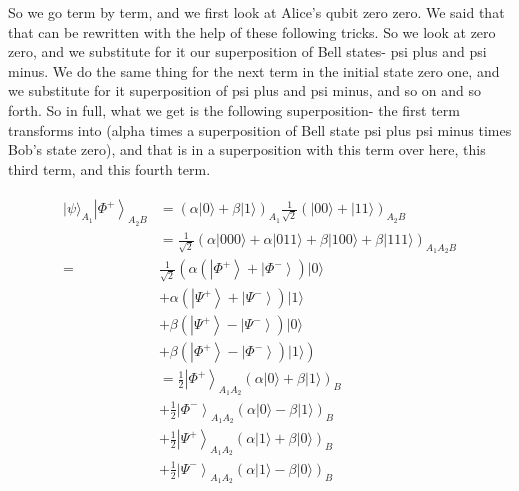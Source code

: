 So we go term by term, and we first look at Alice's qubit zero zero. We said that that can be rewritten with the help of these following tricks. So we look at zero zero, and we substitute for it our superposition of Bell states- psi plus and psi minus. We do the same thing for the next term in the initial state zero one, and we substitute for it superposition of psi plus and psi minus, and so on and so forth. So in full, what we get is the following superposition- the first term transforms into (alpha times a superposition of Bell state psi plus psi minus times Bob's state zero), and that is in a superposition with this term over here, this third term, and this fourth term.

\begin{align}
    \begin{aligned}
|\psi\rangle_{A_{1}}\left|\Phi^{+}\right\rangle_{A_{2} B} &=(\alpha|0\rangle+\beta|1\rangle)_{A_{1}} \frac{1}{\sqrt{2}}(|00\rangle+|11\rangle)_{A_{2} B} \\
&=\frac{1}{\sqrt{2}}(\alpha|000\rangle+\alpha|011\rangle+\beta|100\rangle+\beta|111\rangle)_{A_{1} A_{2} B} \\
=& \frac{1}{\sqrt{2}}\left(\alpha\left(\left|\Phi^{+}\right\rangle+\left|\Phi^{-}\right\rangle\right)|0\rangle\right.\\
&+\alpha\left(\left|\Psi^{+}\right\rangle+\left|\Psi^{-}\right\rangle\right)|1\rangle \\
&+\beta\left(\left|\Psi^{+}\right\rangle-\left|\Psi^{-}\right\rangle\right)|0\rangle \\
&\left.+\beta\left(\left|\Phi^{+}\right\rangle-\left|\Phi^{-}\right\rangle\right)|1\rangle\right) \\
&=\frac{1}{2}\left|\Phi^{+}\right\rangle_{A_{1} A_{2}}(\alpha|0\rangle+\beta|1\rangle)_{B} \\
&+\frac{1}{2}\left|\Phi^{-}\right\rangle_{A_{1} A_{2}}(\alpha|0\rangle-\beta|1\rangle)_{B} \\
&+\frac{1}{2}\left|\Psi^{+}\right\rangle_{A_{1} A_{2}}(\alpha|1\rangle+\beta|0\rangle)_{B} \\
&+\frac{1}{2}\left|\Psi^{-}\right\rangle_{A_{1} A_{2}}(\alpha|1\rangle-\beta|0\rangle)_{B}
\end{aligned}
\end{align}
